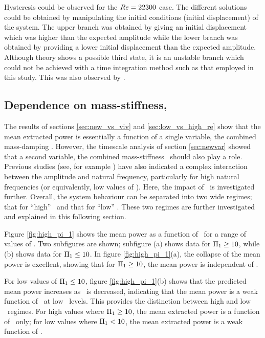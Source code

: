 

Hysteresis could be observed for the $Re = 22300$ case. The different solutions could be obtained by manipulating the initial conditions (initial displacement) of the system. The upper branch was obtained by giving an initial displacement which was higher than the expected amplitude while the lower branch was obtained by providing a lower initial displacement than the expected amplitude. Although theory shows a possible third state, it is an unstable branch which could not be achieved with a time integration method such as that employed in this study. This was also observed by \cite{Vio2007}.


\subsection{Dependence on mass-stiffness, \massstiff}
\label{subsec:dependence pi_1}

The results of sections \ref{sec:new_vs_viv} and \ref{sec:low_vs_high_re} show that the mean extracted power is essentially a function of a single variable, the combined mass-damping \massdamp. However, the timescale analysis of section \ref{sec:newvar} showed that a second variable, the combined mass-stiffness \massstiff\ should also play a role. Previous studies (see, for example \citet{bouclin:77}) have also indicated a complex interaction between the amplitude and natural frequency, particularly for high natural frequencies (or equivalently, low values of \massstiff). Here, the impact of \massstiff\ is investigated further. Overall, the system behaviour can be separated into two wide regimes; that for ``high'' \massstiff\ and that for ``low'' \massstiff. These two regimes are further investigated and explained in this following section.

Figure \ref{fig:high_pi_1} shows the mean power as a function of \massdamp\ for a range of values of \massstiff. Two subfigures are shown; subfigure (a) shows data for $\Pi_1 \geq 10$, while (b) shows data for $\Pi_1 \leq 10$. In figure \ref{fig:high_pi_1}(a), the collapse of the mean power is excellent, showing that for $\Pi_1 \geq 10$, the mean power is independent of \massstiff.



For low values of $\Pi_1 \leq 10$, figure \ref{fig:high_pi_1}(b) shows that the predicted mean power increases as \massstiff\ is decreased, indicating that the mean power is a weak function of \massstiff\ at low \massstiff\ levels. This provides the distinction between high and low \massstiff\ regimes. For high values where $\Pi_1 \geq 10$, the mean extracted power is a function of \massdamp\ only; for low values where $\Pi_1 < 10$, the mean extracted power is a weak function of \massstiff.

